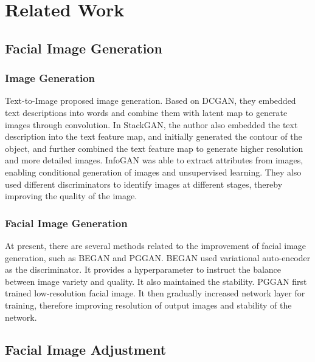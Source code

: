 \section{Related Work}

\subsection{Facial Image Generation}

\subsubsection*{Image Generation}

Text-to-Image proposed image generation.
Based on DCGAN, they embedded text descriptions into words and combine them with latent map to generate images through convolution.
In StackGAN, the author also embedded the text description into the text feature map,
    and initially generated the contour of the object,
    and further combined the text feature map to generate higher resolution and more detailed images.
InfoGAN was able to extract attributes from images, enabling conditional generation of images and unsupervised learning.
They also used different discriminators to identify images at different stages, thereby improving the quality of the image.


\subsubsection*{Facial Image Generation}

At present, there are several methods related to the improvement of facial image generation,
    such as BEGAN and PGGAN.
BEGAN used variational auto-encoder as the discriminator.
It provides a hyperparameter to instruct the balance between image variety and quality.
It also maintained the stability.
PGGAN first trained low-resolution facial image.
It then gradually increased network layer for training,
therefore improving resolution of output images and stability of the network.



\subsection{Facial Image Adjustment}

